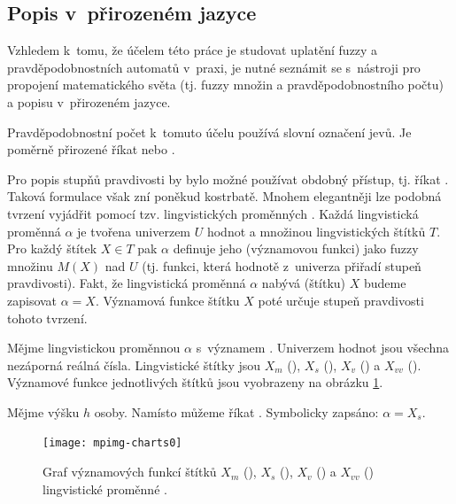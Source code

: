 \subsection{Popis v~přirozeném jazyce}
Vzhledem k~tomu, že účelem této práce je studovat uplatění fuzzy a pravděpodobnostních automatů v~praxi, je nutné seznámit se s~nástroji pro propojení matematického světa (tj. fuzzy množin a pravděpodobnostního počtu) a popisu v~přirozeném jazyce.

Pravděpodobnostní počet k~tomuto účelu používá slovní označení jevů. Je poměrně přirozené říkat  nebo .

Pro popis stupňů pravdivosti by bylo možné používat obdobný přístup, tj. říkat . Taková formulace však zní poněkud kostrbatě. Mnohem elegantněji lze podobná tvrzení vyjádřit pomocí tzv. lingvistických proměnných \cite{Zad-ConLingVarAppApprRea}. Každá lingvistická proměnná $\alpha$ je tvořena univerzem $U$ hodnot a množinou lingvistických štítků $T$. Pro každý štítek $X \in T$ pak $\alpha$ definuje jeho  (významovou funkci) jako fuzzy množinu $M(X)$ nad $U$ (tj. funkci, která hodnotě z~univerza přiřadí stupeň pravdivosti). Fakt, že lingvistická proměnná $\alpha$ nabývá  (štítku) $X$ budeme zapisovat $\alpha = X$. Významová funkce štítku $X$ poté určuje stupeň pravdivosti tohoto tvrzení.

\begin{example}
 Mějme lingvistickou proměnnou $\alpha$ s~významem . Univerzem hodnot jsou všechna nezáporná reálná čísla. Lingvistické štítky jsou $X_m$ (), $X_s$ (), $X_v$ () a $X_{vv}$ (). Významové funkce jednotlivých štítků jsou vyobrazeny na obrázku \ref{fig:lingVarsMeansChart}.

 Mějme výšku $h$ osoby. Namísto  můžeme říkat . Symbolicky zapsáno: $\alpha = X_s$.
\end{example}

\begin{figure}
 \centering
 \texttt{[image: mpimg-charts0]}
 
 \caption[Graf významových funkcí štítků]{Graf významových funkcí štítků $X_m$ (), $X_s$ (), $X_v$ () a $X_{vv}$ () lingvistické proměnné .} \label{fig:lingVarsMeansChart}
\end{figure}

